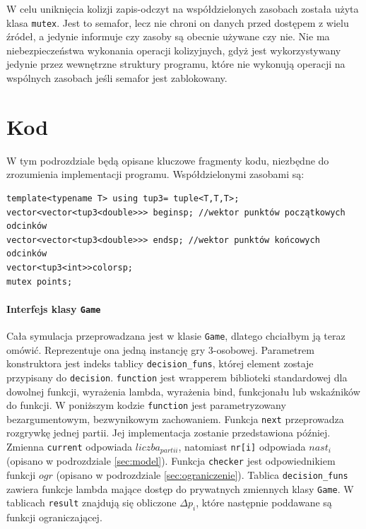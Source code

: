 W celu uniknięcia kolizji zapis-odczyt na współdzielonych zasobach została użyta klasa \texttt{mutex}. Jest to semafor, lecz nie chroni on danych przed dostępem z wielu źródeł, a jedynie informuje czy zasoby są obecnie używane czy nie. Nie ma niebezpieczeństwa wykonania operacji kolizyjnych, gdyż jest wykorzystywany jedynie przez wewnętrzne struktury programu, które nie wykonują operacji na wspólnych zasobach jeśli semafor jest zablokowany.

\section{Kod}
\label{sec::kod}
W tym podrozdziale będą opisane kluczowe fragmenty kodu, niezbędne do zrozumienia implementacji programu. Współdzielonymi zasobami są:
\begin{lstlisting}
template<typename T> using tup3= tuple<T,T,T>;
vector<vector<tup3<double>>> beginsp; //wektor punktów początkowych odcinków
vector<vector<tup3<double>>> endsp; //wektor punktów końcowych odcinków
vector<tup3<int>>colorsp;
mutex points;
\end{lstlisting}

\paragraph{Interfejs klasy \texttt{Game}}
Cała symulacja przeprowadzana jest w klasie \texttt{Game}, dlatego chciałbym ją teraz omówić. Reprezentuje ona jedną instancję gry 3-osobowej. Parametrem konstruktora jest indeks tablicy \texttt{decision\_funs}, której element zostaje przypisany do \texttt{decision}. \texttt{function} jest wrapperem biblioteki standardowej dla dowolnej funkcji, wyrażenia lambda, wyrażenia bind, funkcjonału lub wskaźników do funkcji. W poniższym kodzie \texttt{function} jest parametryzowany bezargumentowym, bezwynikowym zachowaniem. Funkcja \texttt{next} przeprowadza rozgrywkę jednej partii. Jej implementacja zostanie przedstawiona później. Zmienna \texttt{current} odpowiada $liczba_{partii}$, natomiast \texttt{nr[i]} odpowiada $nast_i$ (opisano w podrozdziale \ref{sec:model}). Funkcja \texttt{checker} jest odpowiednikiem funkcji $ogr$ (opisano w podrozdziale \ref{sec:ograniczenie}). Tablica \texttt{decision\_funs} zawiera funkcje lambda mające dostęp do prywatnych zmiennych klasy \texttt{Game}. W tablicach \texttt{result} znajdują się obliczone $\Delta p_i$, które następnie poddawane są funkcji ograniczającej. 

